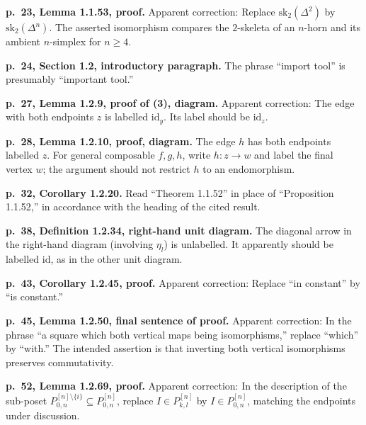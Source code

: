 \par{}
\noindent\textbf{p.~23, Lemma 1.1.53, proof.}\enspace
Apparent correction: Replace $\mathrm{sk}_2(\Delta^2)$ by $\mathrm{sk}_2(\Delta^n)$. The asserted isomorphism compares the $2$-skeleta of an $n$-horn and its ambient $n$-simplex for $n\ge4$.

\par{}
\noindent\textbf{p.~24, Section 1.2, introductory paragraph.}\enspace
The phrase ``import tool'' is presumably ``important tool.''

\par{}
\noindent\textbf{p.~27, Lemma 1.2.9, proof of (3), diagram.}\enspace
Apparent correction: The edge with both endpoints $z$ is labelled $\mathrm{id}_y$. Its label should be $\mathrm{id}_z$.

\par{}
\noindent\textbf{p.~28, Lemma 1.2.10, proof, diagram.}\enspace
The edge $h$ has both endpoints labelled $z$. For general composable $f,g,h$, write $h\colon z\to w$ and label the final vertex $w$; the argument should not restrict $h$ to an endomorphism.

\par{}
\noindent\textbf{p.~32, Corollary 1.2.20.}\enspace
Read ``Theorem 1.1.52'' in place of ``Proposition 1.1.52,'' in accordance with the heading of the cited result.

\par{}
\noindent\textbf{p.~38, Definition 1.2.34, right-hand unit diagram.}\enspace
The diagonal arrow in the right-hand diagram (involving $\eta_l$) is unlabelled. It apparently should be labelled $\mathrm{id}$, as in the other unit diagram.

\par{}
\noindent\textbf{p.~43, Corollary 1.2.45, proof.}\enspace
Apparent correction: Replace ``in constant'' by ``is constant.''

\par{}
\noindent\textbf{p.~45, Lemma 1.2.50, final sentence of proof.}\enspace
Apparent correction: In the phrase ``a square which both vertical maps being isomorphisms,'' replace ``which'' by ``with.'' The intended assertion is that inverting both vertical isomorphisms preserves commutativity.

\par{}
\noindent\textbf{p.~52, Lemma 1.2.69, proof.}\enspace
Apparent correction: In the description of the sub-poset $P^{[n]\setminus\{i\}}_{0,n}\subseteq P^{[n]}_{0,n}$, replace $I\in P^{[n]}_{k,l}$ by $I\in P^{[n]}_{0,n}$, matching the endpoints under discussion.

